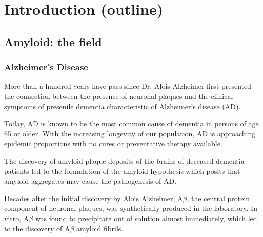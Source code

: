 \chapter{Introduction (outline)}

\section{Amyloid: the field} %


\subsection{Alzheimer's Disease}
\begin{outline}[enumerate]
\1 More than a hundred years have pass since Dr. Alois Alzheimer first presented the connection between the presence of neuronal plaques and the clinical symptoms of presenile dementia characteristic of Alzheimer's disease (AD).

\1 Today, AD is known to be the most common cause of dementia in persons of age 65 or older. With the increasing longevity of our population, AD is approaching epidemic proportions with no cures or preventative therapy available.\cite{Blennow:2006wd}

\1 The discovery of amyloid plaque deposits of the brains of deceased dementia patients led to the formulation of the amyloid hypothesis which posits that amyloid aggregates may cause the pathogenesis of AD.  

\1 Decades after the initial discovery by Alois Alzheimer, A$\beta$, the central protein component of neuronal plaques, was synthetically produced in the laboratory. In vitro, A$\beta$ was found to precipitate out of solution almost immediately, which led to the discovery of A$\beta$ amyloid fibrils.


\end{outline}

